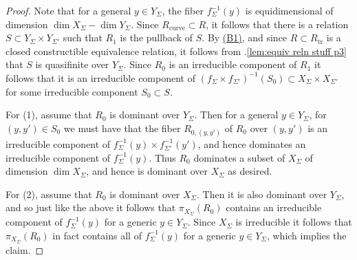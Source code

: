 \documentclass{amsart}
\newcommand{\customref}[2]{\hyperref[#1]{#2}}
\theoremstyle{definition}
\theoremstyle{remark}
\def\trans{\mathrm{tr}}
\def\curve{\mathrm{curve}}
\numberwithin{equation}{section}
\begin{document}
\begin{proof}
Note that for a general $y\in Y_{\Sigma}$, the fiber $f_{\Sigma}^{-1}(y)$ is equidimensional of dimension $\dim X_{\Sigma}-\dim Y_{\Sigma}$. Since $R_\curve\subset R$, it follows that there is a relation $S\subset Y_\Sigma\times Y_{\Sigma'}$ such that $R_1$ is the pullback of $S$.  By \customref{b1}{(B1)}, and since $R\subset R_{\trans}$ is a closed constructible equivalence relation, it follows from .\eqref{lem:equiv reln stuff p3} that $S$ is quasifinite over $Y_{\Sigma}$. Since $R_0$ is an irreducible component of $R_1$ it follows that it is an irreducible component of $(f_{\Sigma}\times f_{\Sigma'})^{-1}(S_0) \subset X_{\Sigma} \times X_{\Sigma'}$
for some irreducible component $S_0\subset S$.

For (1), assume that $R_0$ is dominant over $Y_{\Sigma}$. Then for a general $y\in Y_{\Sigma}$, for $(y,y')\in S_0$ we must have that the fiber $R_{0,(y,y')}$ of $R_0$ over $(y,y')$ is an irreducible component of $f_{\Sigma}^{-1}(y)\times f_{\Sigma'}^{-1}(y')$, and hence dominates an irreducible component of $f_{\Sigma}^{-1}(y)$. Thus $R_0$ dominates a subset of $X_\Sigma$ of dimension $\dim X_{\Sigma}$, and hence is dominant over $X_\Sigma$ as desired.

For (2), assume that $R_0$ is dominant over $X_{\Sigma}$. Then it is also dominant over $Y_{\Sigma}$, and so just like the above it follows that $\pi_{X_{\Sigma}}(R_0)$ contains an irreducible component of $f_{\Sigma}^{-1}(y)$ for a generic $y\in Y_{\Sigma}$. Since $X_{\Sigma}$ is irreducible it follows that $\pi_{X_{\Sigma}}(R_0)$ in fact contains all of $f_{\Sigma}^{-1}(y)$ for a generic $y\in Y_{\Sigma}$, which implies the claim. 
\end{proof}
\end{document}
